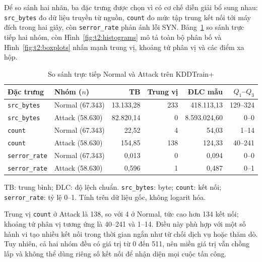 Để so sánh hai nhãn, ba đặc trưng được chọn vì có cơ chế diễn giải bổ sung nhau: \texttt{src\_bytes} đo dữ liệu truyền từ nguồn, \texttt{count} đo mức tập trung kết nối tới máy đích trong hai giây, còn \texttt{serror\_rate} phản ánh lỗi SYN. Bảng~\ref{tab:t2:comparison} so sánh trực tiếp hai nhóm, còn Hình~\ref{fig:t2:histograms} mô tả toàn bộ phân bố và Hình~\ref{fig:t2:boxplots} nhấn mạnh trung vị, khoảng tứ phân vị và các điểm xa hộp.
\begin{table}[H]
\centering
\caption{So sánh trực tiếp Normal và Attack trên KDDTrain+}
\label{tab:t2:comparison}
\small
\setlength{\tabcolsep}{3pt}
\begin{tabular}{llrrrr}
\toprule
Đặc trưng & Nhóm ($n$) & TB & Trung vị & ĐLC mẫu & $Q_1$--$Q_3$ \\
\midrule
\texttt{src\_bytes} & Normal (67.343) & 13.133,28 & 233 & 418.113,13 & 129--324 \\
\texttt{src\_bytes} & Attack (58.630) & 82.820,14 & 0 & 8.593.024,60 & 0--0 \\
\texttt{count} & Normal (67.343) & 22,52 & 4 & 54,03 & 1--14 \\
\texttt{count} & Attack (58.630) & 154,85 & 138 & 124,33 & 40--241 \\
\texttt{serror\_rate} & Normal (67.343) & 0,013 & 0 & 0,094 & 0--0 \\
\texttt{serror\_rate} & Attack (58.630) & 0,596 & 1 & 0,487 & 0--1 \\
\bottomrule
\end{tabular}
\par\smallskip\footnotesize TB: trung bình; ĐLC: độ lệch chuẩn. \texttt{src\_bytes}: byte; \texttt{count}: kết nối; \texttt{serror\_rate}: tỷ lệ 0--1. Tính trên dữ liệu gốc, không logarit hóa.
\end{table}
Trung vị \texttt{count} ở Attack là 138, so với 4 ở Normal, tức cao hơn 134 kết nối; khoảng tứ phân vị tương ứng là 40--241 và 1--14. Điều này phù hợp với một số hành vi tạo nhiều kết nối trong thời gian ngắn như từ chối dịch vụ hoặc thăm dò. Tuy nhiên, cả hai nhóm đều có giá trị từ 0 đến 511, nên miền giá trị vẫn chồng lấp và không thể dùng riêng số kết nối để nhận diện mọi cuộc tấn công.

